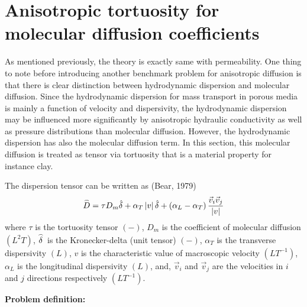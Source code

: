 \section{Anisotropic tortuosity for molecular diffusion coefficients}
As mentioned previously, the theory is exactly same with permeability. One thing to note before introducing another benchmark problem for anisotropic diffusion is that there is clear distinction between hydrodynamic dispersion and molecular diffusion. Since the hydrodynamic dispersion for mass transport in porous media is mainly a function of velocity and dispersivity, the hydrodynamic dispersion may be influenced more significantly by anisotropic hydraulic conductivity as well as pressure distributions than molecular diffusion. However, the hydrodynamic dispersion has also the molecular diffusion term. In this section, this molecular diffusion is treated as tensor via tortuosity that is a material property for instance clay.

The dispersion tensor can be written as (Bear, 1979)
\begin{eqnarray}
\mathord{\buildrel{\lower3pt\hbox{$\scriptscriptstyle\frown$}}
\over D}  = \tau D_m \hat \delta  + \alpha _T \left| v \right|\hat \delta  + \left( {\alpha _L  - \alpha _T } \right)\frac{{\vec v_i \vec v_j }}{{\left| v \right|}}
\end{eqnarray}
where $ \tau $ is the tortuosity tensor $(-) $, $ D_m $  is the coefficient of molecular diffusion $(L^2 T) $, $ \mathord{\buildrel{\lower3pt\hbox{$\scriptscriptstyle\frown$}} \over \delta } $ is the Kronecker-delta (unit tensor) $(-) $,  $ \alpha _T $ is the transverse dispersivity  $(L) $,  $ v $ is the characteristic value of macroscopic velocity $ (LT^{ - 1} ) $, $ \alpha _L $  is the longitudinal dispersivity $(L) $, and, $ \vec v_i $  and $ \vec v_j $ are the velocities in $ i $ and $ j $ directions respectively $ (LT^{ - 1} ) $.


\textbf{Problem definition:}

